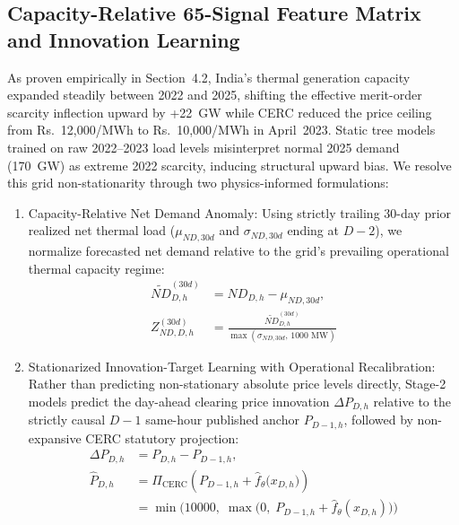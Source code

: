 \documentclass[runningheads,a4paper]{llncs}
\begin{document}
\subsection{Capacity-Relative 65-Signal Feature Matrix and Innovation Learning}
As proven empirically in Section~4.2, India's thermal generation capacity expanded steadily between 2022 and 2025, shifting the effective merit-order scarcity inflection upward by +22~GW while CERC reduced the price ceiling from Rs.~12,000/MWh to Rs.~10,000/MWh in April~2023. Static tree models trained on raw 2022--2023 load levels misinterpret normal 2025 demand (170~GW) as extreme 2022 scarcity, inducing structural upward bias. We resolve this grid non-stationarity through two physics-informed formulations:
\begin{enumerate}
    \item Capacity-Relative Net Demand Anomaly: Using strictly trailing 30-day prior realized net thermal load ($\mu_{ND, 30d}$ and $\sigma_{ND, 30d}$ ending at $D-2$), we normalize forecasted net demand relative to the grid's prevailing operational thermal capacity regime:
    \begin{equation}
    \begin{aligned}
    \widetilde{ND}_{D,h}^{(30d)} &= \widehat{ND}_{D,h} - \mu_{ND, 30d}, \\
    Z_{ND, D, h}^{(30d)} &= \frac{\widetilde{ND}_{D,h}^{(30d)}}{\max(\sigma_{ND, 30d}, \, 1000\text{ MW})}
    \end{aligned}
    \label{eq:cap_relative}
    \end{equation}
    \item Stationarized Innovation-Target Learning with Operational Recalibration: Rather than predicting non-stationary absolute price levels directly, Stage-2 models predict the day-ahead clearing price innovation $\Delta P_{D,h}$ relative to the strictly causal $D-1$ same-hour published anchor $P_{D-1, h}$, followed by non-expansive CERC statutory projection:
    \begin{equation}
    \begin{aligned}
    \Delta P_{D,h} &= P_{D,h} - P_{D-1, h}, \\
    \hat{P}_{D,h} &= \Pi_{\text{CERC}}\!\left(P_{D-1, h} + \hat{f}_{\theta}\big(x_{D,h}\big)\right) \\
    &= \min\!\Big(10000, \; \max\!\big(0, \; P_{D-1, h} + \hat{f}_{\theta}(x_{D,h})\big)\Big)
    \end{aligned}
    \label{eq:innovation_cerc}
    \end{equation}
\end{enumerate}
\end{document}
